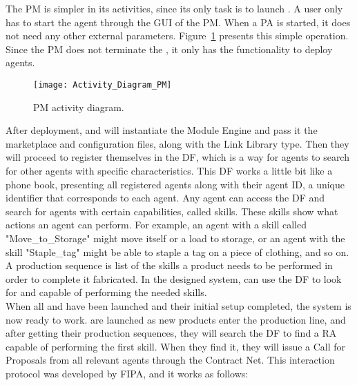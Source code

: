 The \acrlong{PM} is simpler in its activities, since its only task is to launch . A user only has to start the agent through the \acrshort{GUI} of the \acrshort{PM}. When a \acrshort{PA} is started, it does not need any other external parameters. Figure~\ref{fig:pm_activity_diagram} presents this simple operation. Since the \acrshort{PM} does not terminate the , it only has the functionality to deploy agents.\\

\begin{figure}[h!]
	\centering
	\texttt{[image: Activity\_Diagram\_PM]}
	\caption{\acrlong{PM} activity diagram.}
	\label{fig:pm_activity_diagram}
\end{figure}

After deployment,  and  will instantiate the Module Engine and pass it the marketplace and configuration files, along with the Link Library type. Then they will proceed to register themselves in the \acrlong{DF}, which is a way for agents to search for other agents with specific characteristics. This \acrshort{DF} works a little bit like a phone book, presenting all registered agents along with their agent ID, a unique identifier that corresponds to each agent. Any agent can access the \acrshort{DF} and search for agents with certain capabilities, called skills. These skills show what actions an agent can perform. For example, an agent with a skill called "Move\_to\_Storage" might move itself or a load to storage, or an agent with the skill "Staple\_tag" might be able to staple a tag on a piece of clothing, and so on. A production sequence is list of the skills a product needs to be performed in order to complete it fabricated. In the designed system,  can use the \acrshort{DF} to look for  and  capable of performing the needed skills.\\

When all  and  have been launched and their initial setup completed, the system is now ready to work.  are launched as new products enter the production line, and after getting their production sequences, they will search the \acrshort{DF} to find a \acrshort{RA} capable of performing the first skill. When they find it, they will issue a Call for Proposals from all relevant agents through the Contract Net. This interaction protocol was developed by \acrshort{FIPA}, and it works as follows:

